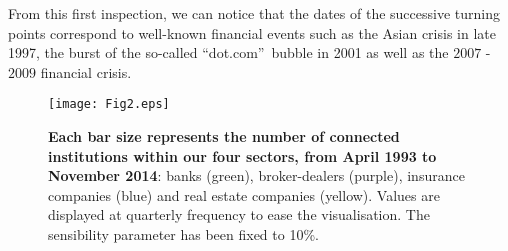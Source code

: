 \documentclass[a4paper,10pt]{article}
\begin{document}
 From this first inspection, we can notice that the dates of the successive turning points correspond to well-known financial 
 events such as the Asian crisis in late 1997, the burst of the so-called \textquotedblleft dot.com\textquotedblright\ bubble
 in 2001 as well as the  $2007$ - $2009$ financial crisis.  \\
\begin{figure}[!h]
\centering
\texttt{[image: Fig2.eps]}
\caption{{\bf Each bar size represents the number of connected institutions within our four sectors, from April 1993 to November 2014}: banks (green), 
broker-dealers (purple), insurance companies (blue) and real estate companies (yellow). Values are displayed at quarterly 
frequency to ease the visualisation. The sensibility parameter has been fixed to 10\%.} 
\label{fig:2}
\end{figure}
\end{document}
